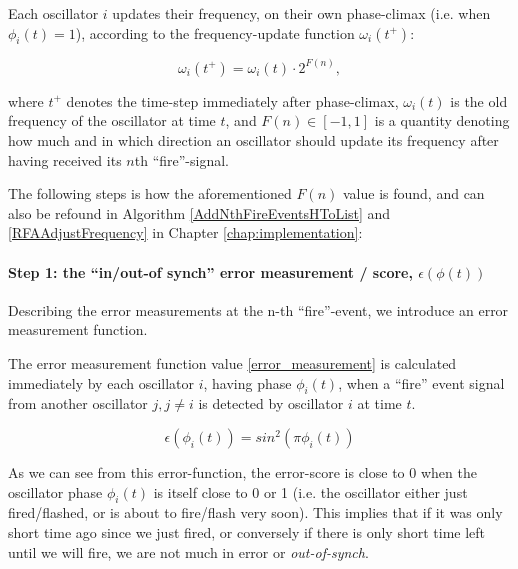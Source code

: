 	Each oscillator $i$ updates their frequency, on their own phase-climax (i.e. when $\phi_i(t)=1$), according to the frequency-update function $\omega_i(t^+)$:

	\begin{equation}
		\omega_i(t^+) = \omega_i(t) \cdot 2^{F(n)},
	\end{equation}

	where $t^+$ denotes the time-step immediately after phase-climax, $\omega_i(t)$ is the old frequency of the oscillator at time $t$, and $F(n) \in [-1,1]$ is a quantity denoting how much and in which direction an oscillator should update its frequency after having received its $n$th ``fire''-signal.

	The following steps is how the aforementioned $F(n)$ value is found, and can also be refound in Algorithm \ref{AddNthFireEventsHToList} and \ref{RFAAdjustFrequency} in Chapter \ref{chap:implementation}:

		\paragraph{Step 1: the ``in/out-of synch'' error measurement / score, $\epsilon(\phi(t))$}

		Describing the error measurements at the n-th ``fire''-event, we introduce an error measurement function.

		The error measurement function value \eqref{error_measurement} is calculated immediately by each oscillator $i$, having phase $\phi_i(t)$, when a ``fire'' event signal from another oscillator $j, j \neq i$ is detected by oscillator $i$ at time $t$.

		\begin{equation}
		\label{error_measurement}
			\epsilon(\phi_i(t)) = sin^2(\pi\phi_i(t))
		\end{equation} \nl
		

		As we can see from this error-function, the error-score is close to 0 when the oscillator phase $\phi_i(t)$ is itself close to 0 or 1 (i.e. the oscillator either just fired/flashed, or is about to fire/flash very soon). This implies that if it was only short time ago since we just fired, or conversely if there is only short time left until we will fire, we are not much in error or \textit{out-of-synch}. 

